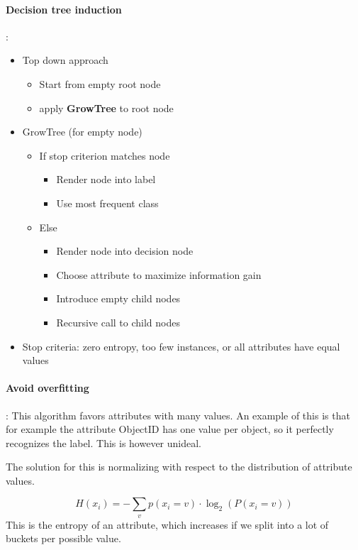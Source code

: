 \documentclass{article}
\begin{document}
\paragraph{Decision tree induction}: 
\begin{itemize}
  \item Top down approach
  \begin{itemize}
    \item Start from empty root node
    \item apply \textbf{GrowTree} to root node
  \end{itemize}
  \item GrowTree (for empty node)
  \begin{itemize}
    \item If stop criterion matches node
    \begin{itemize}
      \item Render node into label
      \item Use most frequent class
    \end{itemize}
    \item Else
    \begin{itemize}
      \item Render node into decision node
      \item Choose attribute to maximize information gain
      \item Introduce empty child nodes
      \item Recursive call to child nodes
    \end{itemize}
  \end{itemize}
  \item Stop criteria: zero entropy, too few instances, or all attributes have equal values
\end{itemize}

\paragraph{Avoid overfitting}: This algorithm favors attributes with many values. An example of this is that for example the attribute ObjectID has one value per object, so it perfectly recognizes the label. This is however unideal.

The solution for this is normalizing with respect to the distribution of attribute values.
 
\[H(x_i) = -\sum_v p(x_i = v)\cdot \log_2(P(x_i = v))\]
This is the entropy of an attribute, which increases if we split into a lot of buckets per possible value.
\end{document}
